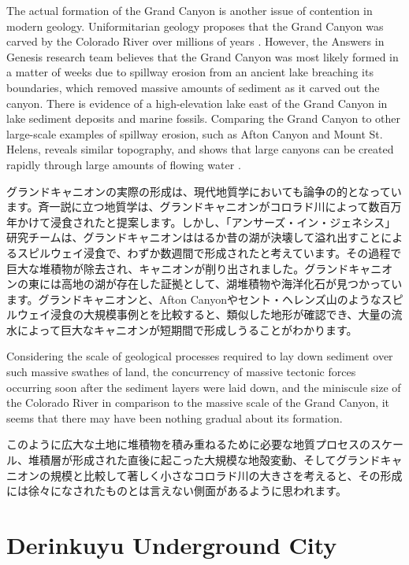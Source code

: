 \documentclass[10pt,twocolumn,letterpaper]{article}
\begin{document}
The actual formation of the Grand Canyon is another issue of contention in modern geology. Uniformitarian geology proposes that the Grand Canyon was carved by the Colorado River over millions of years \cite{47}. However, the Answers in Genesis research team believes that the Grand Canyon was most likely formed in a matter of weeks due to spillway erosion from an ancient lake breaching its boundaries, which removed massive amounts of sediment as it carved out the canyon. There is evidence of a high-elevation lake east of the Grand Canyon in lake sediment deposits and marine fossils. Comparing the Grand Canyon to other large-scale examples of spillway erosion, such as Afton Canyon and Mount St. Helens, reveals similar topography, and shows that large canyons can be created rapidly through large amounts of flowing water \cite{48}.

グランドキャニオンの実際の形成は、現代地質学においても論争の的となっています。斉一説に立つ地質学は、グランドキャニオンがコロラド川によって数百万年かけて浸食されたと提案します\cite{47}。しかし、「アンサーズ・イン・ジェネシス」研究チームは、グランドキャニオンははるか昔の湖が決壊して溢れ出すことによるスピルウェイ浸食で、わずか数週間で形成されたと考えています。その過程で巨大な堆積物が除去され、キャニオンが削り出されました。グランドキャニオンの東には高地の湖が存在した証拠として、湖堆積物や海洋化石が見つかっています。グランドキャニオンと、Afton Canyonやセント・ヘレンズ山のようなスピルウェイ浸食の大規模事例とを比較すると、類似した地形が確認でき、大量の流水によって巨大なキャニオンが短期間で形成しうることがわかります\cite{48}。

Considering the scale of geological processes required to lay down sediment over such massive swathes of land, the concurrency of massive tectonic forces occurring soon after the sediment layers were laid down, and the miniscule size of the Colorado River in comparison to the massive scale of the Grand Canyon, it seems that there may have been nothing gradual about its formation.

このように広大な土地に堆積物を積み重ねるために必要な地質プロセスのスケール、堆積層が形成された直後に起こった大規模な地殻変動、そしてグランドキャニオンの規模と比較して著しく小さなコロラド川の大きさを考えると、その形成には徐々になされたものとは言えない側面があるように思われます。

\section{Derinkuyu Underground City}
\end{document}
